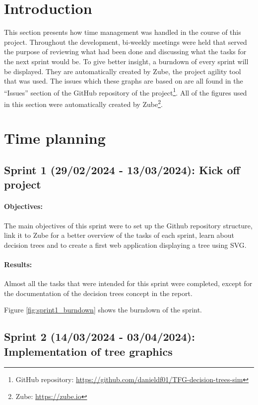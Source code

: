 
\section{Introduction}
This section presents how time management was handled in the course of this project. Throughout the development, bi-weekly meetings were held that served the purpose of reviewing what had been done and discussing what the tasks for the next sprint would be. To give better insight, a burndown of every sprint will be displayed. They are automatically created by Zube, the project agility tool that was used. The issues which these graphs are based on are all found in the ``Issues'' section of the GitHub repository of the project\footnote{GitHub repository: \url{https://github.com/danieldf01/TFG-decision-trees-sim}}. All of the figures used in this section were automatically created by Zube\footnote{Zube: \url{https://zube.io}}.

\section{Time planning}
\subsection{Sprint 1 (29/02/2024 - 13/03/2024): Kick off project}
\paragraph{Objectives:}
The main objectives of this sprint were to set up the Github repository structure, link it to Zube for a better overview of the tasks of each sprint, learn about decision trees and to create a first web application displaying a tree using SVG.

\paragraph{Results:}
Almost all the tasks that were intended for this sprint were completed, except for the documentation of the decision trees concept in the report.

Figure \ref{fig:sprint1_burndown} shows the burndown of the sprint.

\subsection{Sprint 2 (14/03/2024 - 03/04/2024): Implementation of tree graphics}
